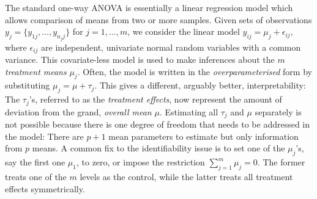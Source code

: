 \documentclass[a4paper,showframe,11pt,draft]{report}
\begin{document}
The standard one-way ANOVA is essentially a linear regression model which allows comparison of means from two or more samples.
Given sets of observations $y_j = \{y_{1j},\dots,y_{n_jj}\}$ for $j=1,\dots,m$, we consider the linear model $y_{ij} = \mu_j + \epsilon_{ij}$, where $\epsilon_{ij}$ are independent, univariate normal random variables with a common variance.
This covariate-less model is used to make inferences about the $m$ \emph{treatment means} $\mu_j$.
Often, the model is written in the \emph{overparameterised} form by substituting $\mu_j = \mu + \tau_j$.
This gives a different, arguably better, interpretability: The $\tau_j$'s, referred to as the \emph{treatment effects}, now represent the amount of deviation from the grand, \emph{overall mean} $\mu$.
Estimating all $\tau_j$ and $\mu$ separately is not possible because there is one degree of freedom that needs to be addressed in the model: There are $p+1$ mean parameters to estimate but only information from $p$ means.
A common fix to the identifiability issue is to set one of the $\mu_j$'s, say the first one $\mu_1$, to zero, or impose the restriction $\sum_{j=1}^m \mu_j = 0$.
The former treats one of the $m$ levels as the control, while the latter treats all treatment effects symmetrically.

\end{document}

